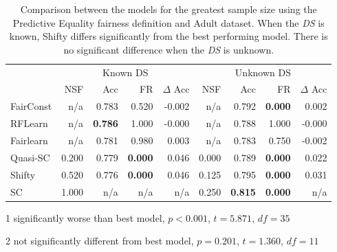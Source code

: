 \begin{table}[H]
\begin{threeparttable}
\centering
\label{pe_adult}
\begin{tabular}{lrrrrrrrr}
\toprule
 & \multicolumn{4}{c}{Known DS} & \multicolumn{4}{c}{Unknown DS} \\
 & NSF & Acc & FR & $\Delta$ Acc & NSF & Acc & FR & $\Delta$ Acc \\
\cmidrule(r){2-5} \cmidrule{6-9}
FairConst & n/a & 0.783 & 0.520 & -0.002 & n/a & 0.792 & \bfseries 0.000 & 0.002 \\
RFLearn & n/a & \bfseries 0.786 & 1.000 & -0.000 & n/a & 0.788 & 1.000 & -0.000 \\
Fairlearn & n/a & 0.781 & 0.980 & 0.003 & n/a & 0.783 & 0.750 & -0.002 \\
Quasi-SC & 0.200 & 0.779 & \bfseries 0.000 & 0.046 & 0.000 & 0.789 & \bfseries 0.000 & 0.022 \\
Shifty & 0.520 & 0.776\tnote{1} & \bfseries 0.000 & 0.046 & 0.125 & 0.795\tnote{2} & \bfseries 0.000 & 0.031 \\
SC & 1.000 & n/a & n/a & n/a & 0.250 & \bfseries 0.815 & \bfseries 0.000 & n/a \\
\bottomrule
\end{tabular}
\begin{tablenotes}
\item[1] significantly worse than best model, $p<0.001$, $t=5.871$, $df=35$
\item[2] not significantly different from best model, $p=0.201$, $t=1.360$, $df=11$
\end{tablenotes}
\end{threeparttable}
\caption{Comparison between the models for the greatest sample size using the Predictive Equality fairness definition and Adult dataset. When the \textit{DS} is known, Shifty differs significantly from the best performing model. There is no significant difference when the \textit{DS} is unknown.}
\end{table}
\clearpage


